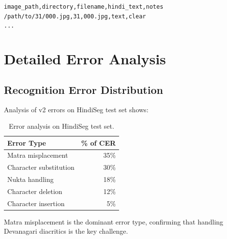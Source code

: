 \documentclass[14pt,a4paper]{article}
\begin{document}
\begin{appendices}
\begin{lstlisting}
image_path,directory,filename,hindi_text,notes
/path/to/31/000.jpg,31,000.jpg,text,clear
...
\end{lstlisting}

\section{Detailed Error Analysis}

\subsection{Recognition Error Distribution}

Analysis of v2 errors on HindiSeg test set shows:

\begin{table}[h]
    \centering
    \begin{tabular}{lr}
        \toprule
        \textbf{Error Type} & \textbf{\% of CER} \\
        \midrule
        Matra misplacement & 35\% \\
        Character substitution & 30\% \\
        Nukta handling & 18\% \\
        Character deletion & 12\% \\
        Character insertion & 5\% \\
        \bottomrule
    \end{tabular}
    \caption{Error analysis on HindiSeg test set.}
\end{table}

Matra misplacement is the dominant error type, confirming that handling Devanagari diacritics is the key challenge.

\end{appendices}
\end{document}
